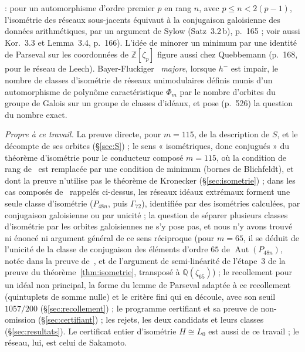 \documentclass[11pt,a4paper]{amsart}
\theoremstyle{plain}
\theoremstyle{definition}
\numberwithin{equation}{section}
\newcommand{\Q}{\mathbb{Q}}
\newcommand{\Z}{\mathbb{Z}}
\DeclareMathOperator{\Aut}{Aut}
\newcommand{\Lz}{L_{0}}
\begin{document}
: pour un automorphisme d'ordre premier $p$ en rang $n$, avec $p\le n<2(p-1)$, l'isométrie des réseaux sous-jacents équivaut à la conjugaison galoisienne des données arithmétiques, par un argument de Sylow (Satz~3.2\,b), p.~165 ; voir aussi Kor.~3.3 et Lemma~3.4, p.~166). L'idée de minorer un minimum par une identité de Parseval sur les coordonnées de $\Z[\zeta_p]$ figure aussi chez Quebbemann (p.~168, pour le réseau de Leech). Bayer-Fluckiger~\cite[cor.~3.3]{Bay84} \emph{majore}, lorsque $h^-$ est impair, le nombre de classes d'isométrie de réseaux unimodulaires définis munis d'un automorphisme de polynôme caractéristique $\Phi_m$ par le nombre d'orbites du groupe de Galois sur un groupe de classes d'idéaux, et pose (p.~526) la question du nombre exact.

\emph{Propre à ce travail.} La preuve directe, pour $m=115$, de la description de $S$, et le décompte de ses orbites (\S\ref{sec:S}) ; le sens « isométriques, donc conjugués » du théorème d'isométrie pour le conducteur composé $m=115$, où la condition de rang de~\cite{Que81} est remplacée par une condition de minimum (bornes de Blichfeldt), et dont la preuve n'utilise pas le théorème de Kronecker (\S\ref{sec:isometrie}) ; dans les cas composés de~\cite{Neb13,Neb16} rappelés ci-dessus, les réseaux idéaux extrémaux forment une seule classe d'isométrie ($P_{48n}$, puis $\Gamma_{72}$), identifiée par des isométries calculées, par conjugaison galoisienne ou par unicité ; la question de séparer plusieurs classes d'isométrie par les orbites galoisiennes ne s'y pose pas, et nous n'y avons trouvé ni énoncé ni argument général de ce sens réciproque (pour $m=65$, il se déduit de l'unicité de la classe de conjugaison des éléments d'ordre $65$ de $\Aut(P_{48n})$, notée dans la preuve de~\cite[th.~5.3]{Neb13}, et de l'argument de semi-linéarité de l'étape~3 de la preuve du théorème~\ref{thm:isometrie}, transposé à $\Q(\zeta_{65})$) ; le recollement pour un idéal non principal, la forme du lemme de Parseval adaptée à ce recollement (quintuplets de somme nulle) et le critère fini qui en découle, avec son seuil $1057/200$ (\S\ref{sec:recollement}) ; le programme certifiant et sa preuve de non-omission (\S\ref{sec:certifiant}) ; les rejets, les deux candidats et leurs classes (\S\ref{sec:resultats}). Le certificat entier d'isométrie $H\cong\Lz$ est aussi de ce travail ; le réseau, lui, est celui de Sakamoto.
\end{document}
